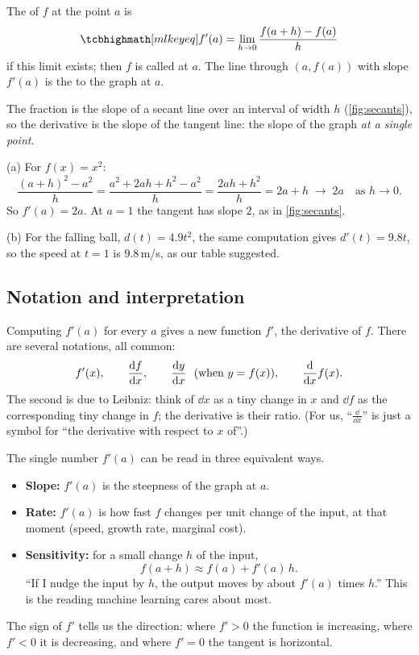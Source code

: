 \begin{definition}[Derivative]\label{def:derivative}
The  of $f$ at the point $a$ is
\[
  \keyeq{f'(a) = \lim_{h\to0}\frac{f(a + h) - f(a)}{h}}
\]
if this limit exists; then $f$ is called  at $a$. The line through $(a, f(a))$ with slope
$f'(a)$ is the  to the graph at $a$.
\end{definition}

The fraction is the slope of a secant line over an interval of width $h$
(\cref{fig:secants}), so the derivative is the slope of the tangent line: the
slope of the graph \emph{at a single point}.

\begin{example}\label{ex:derivative-definition}
(a) For $f(x) = x^2$:
\[
  \frac{(a + h)^2 - a^2}{h} = \frac{a^2 + 2ah + h^2 - a^2}{h}
  = \frac{2ah + h^2}{h} = 2a + h \;\longrightarrow\; 2a
  \quad\text{as } h \to 0 .
\]
So $f'(a) = 2a$. At $a = 1$ the tangent has slope $2$, as in
\cref{fig:secants}.

(b) For the falling ball, $d(t) = 4.9t^2$, the same computation gives
$d'(t) = 9.8t$, so the speed at $t = 1$ is $9.8$\,m/s, as our table
suggested.
\end{example}

\subsection{Notation and interpretation}

Computing $f'(a)$ for every $a$ gives a new function $f'$, the derivative of
$f$. There are several notations, all common:
\[
  f'(x), \qquad \deriv{f}{x}, \qquad \deriv{y}{x} \ \ (\text{when } y = f(x)),
  \qquad \frac{\dd}{\dd x}f(x).
\]
The second is due to Leibniz: think of $\dd x$ as a tiny change in $x$ and
$\dd f$ as the corresponding tiny change in $f$; the derivative is their ratio.
(For us, ``$\frac{\dd}{\dd x}$'' is just a symbol for ``the derivative with
respect to $x$ of''.)

\begin{intuition}
The single number $f'(a)$ can be read in three equivalent ways.
\begin{itemize}
  \item \textbf{Slope:} $f'(a)$ is the steepness of the graph at $a$.
  \item \textbf{Rate:} $f'(a)$ is how fast $f$ changes per unit change of the
    input, at that moment (speed, growth rate, marginal cost).
  \item \textbf{Sensitivity:} for a small change $h$ of the input,
    \[
      f(a + h) \approx f(a) + f'(a)\,h .
    \]
    ``If I nudge the input by $h$, the output moves by about $f'(a)$ times
    $h$.'' This is the reading machine learning cares about most.
\end{itemize}
The sign of $f'$ tells us the direction: where $f' > 0$ the function is
increasing, where $f' < 0$ it is decreasing, and where $f' = 0$ the tangent is
horizontal.
\end{intuition}

